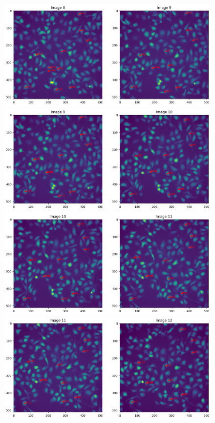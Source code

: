 \documentclass{article}
\begin{document}
\clearpage

\begin{figure}[h!]
\centering
\includegraphics[width=0.75\linewidth]{Report/RImages/Traces_Growth/trace-b9.png}
\includegraphics[width=0.75\linewidth]{Report/RImages/Traces_Growth/trace-b10.png}
\includegraphics[width=0.75\linewidth]{Report/RImages/Traces_Growth/trace-b11.png}
\includegraphics[width=0.75\linewidth]{Report/RImages/Traces_Growth/trace-b12.png}
\end{figure}

\clearpage
\end{document}
